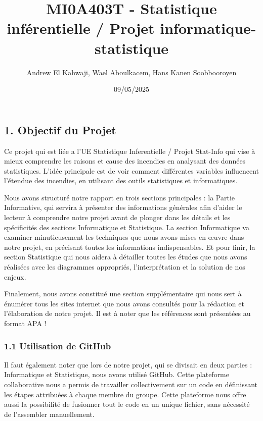 \documentclass[
]{article}
\title{MI0A403T - Statistique inférentielle / Projet
informatique-statistique}
\author{Andrew El Kahwaji, Wael Aboulkacem, Hans Kanen Soobbooroyen}
\date{09/05/2025}
\begin{document}
\maketitle

{
\setcounter{tocdepth}{6}
\tableofcontents
}
\subsection{1. Objectif du Projet}\label{objectif-du-projet}

Ce projet qui est liée a l'UE Statistique Inferentielle / Projet
Stat-Info qui vise à mieux comprendre les raisons et cause des incendies
en analysant des données statistiques. L'idée principale est de voir
comment différentes variables influencent l'étendue des incendies, en
utilisant des outils statistiques et informatiques.

Nous avons structuré notre rapport en trois sections principales : la
Partie Informative, qui servira à présenter des informations générales
afin d'aider le lecteur à comprendre notre projet avant de plonger dans
les détails et les spécificités des sections Informatique et
Statistique. La section Informatique va examiner minutieusement les
techniques que nous avons mises en œuvre dans notre projet, en précisant
toutes les informations indispensables. Et pour finir, la section
Statistique qui nous aidera à détailler toutes les études que nous avons
réalisées avec les diagrammes appropriés, l'interprétation et la
solution de nos enjeux.

Finalement, nous avons constitué une section supplémentaire qui nous
sert à énumérer tous les sites internet que nous avons consultés pour la
rédaction et l'élaboration de notre projet. Il est à noter que les
références sont présentées au format APA !

\subsubsection{1.1 Utilisation de GitHub}\label{utilisation-de-github}

Il faut également noter que lors de notre projet, qui se divisait en
deux parties : Informatique et Statistique, nous avons utilisé GitHub.
Cette plateforme collaborative nous a permis de travailler
collectivement sur un code en définissant les étapes attribuées à chaque
membre du groupe. Cette plateforme nous offre aussi la possibilité de
fusionner tout le code en un unique fichier, sans nécessité de
l'assembler manuellement.
\end{document}
